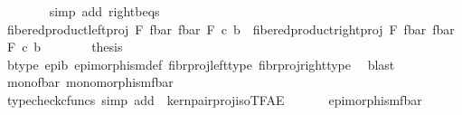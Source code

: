 \begin{isabellebody}
\ \ \ \ \ \ \isamarkupfalse%
\ {\isacharparenleft}{\kern0pt}simp\ add{\isacharcolon}{\kern0pt}\ right{\isacharunderscore}{\kern0pt}b{\isacharunderscore}{\kern0pt}eqs{\isacharparenright}{\kern0pt}\isanewline
\ \ \ \ \isamarkupfalse%
\ \isamarkupfalse%
\ {\isachardoublequoteopen}fibered{\isacharunderscore}{\kern0pt}product{\isacharunderscore}{\kern0pt}left{\isacharunderscore}{\kern0pt}proj\ F\ {\isacharparenleft}{\kern0pt}f{\isacharunderscore}{\kern0pt}bar{\isacharparenright}{\kern0pt}\ {\isacharparenleft}{\kern0pt}f{\isacharunderscore}{\kern0pt}bar{\isacharparenright}{\kern0pt}\ F\ {\isasymcirc}\isactrlsub c\ b\ {\isacharequal}{\kern0pt}\ fibered{\isacharunderscore}{\kern0pt}product{\isacharunderscore}{\kern0pt}right{\isacharunderscore}{\kern0pt}proj\ F\ {\isacharparenleft}{\kern0pt}f{\isacharunderscore}{\kern0pt}bar{\isacharparenright}{\kern0pt}\ {\isacharparenleft}{\kern0pt}f{\isacharunderscore}{\kern0pt}bar{\isacharparenright}{\kern0pt}\ F\ {\isasymcirc}\isactrlsub c\ b{\isachardoublequoteclose}\isacommand{{\isachardot}{\kern0pt}}\isamarkupfalse%
\isanewline
\ \ \ \ \isamarkupfalse%
\ \isamarkupfalse%
\ {\isacharquery}{\kern0pt}thesis\isanewline
\ \ \ \ \ \ \isamarkupfalse%
\ b{\isacharunderscore}{\kern0pt}type\ epi{\isacharunderscore}{\kern0pt}b\ epimorphism{\isacharunderscore}{\kern0pt}def{}\ fibr{\isacharunderscore}{\kern0pt}proj{\isacharunderscore}{\kern0pt}left{\isacharunderscore}{\kern0pt}type\ fibr{\isacharunderscore}{\kern0pt}proj{\isacharunderscore}{\kern0pt}right{\isacharunderscore}{\kern0pt}type\ \isamarkupfalse%
\ blast\isanewline
\ \ \isamarkupfalse%
\isanewline
\ \ \isanewline
\ \ \isamarkupfalse%
\ \isamarkupfalse%
\ mono{\isacharunderscore}{\kern0pt}fbar{\isacharcolon}{\kern0pt}\ {\isachardoublequoteopen}monomorphism{\isacharparenleft}{\kern0pt}f{\isacharunderscore}{\kern0pt}bar{\isacharparenright}{\kern0pt}{\isachardoublequoteclose}\isanewline
\ \ \ \ \isamarkupfalse%
\ {\isacharparenleft}{\kern0pt}typecheck{\isacharunderscore}{\kern0pt}cfuncs{\isacharcomma}{\kern0pt}\ simp\ add{\isacharcolon}{\kern0pt}\ \ kern{\isacharunderscore}{\kern0pt}pair{\isacharunderscore}{\kern0pt}proj{\isacharunderscore}{\kern0pt}iso{\isacharunderscore}{\kern0pt}TFAE{}{\isacharparenright}{\kern0pt}\isanewline
\ \ \isanewline
\ \ \isamarkupfalse%
\ {\isachardoublequoteopen}epimorphism{\isacharparenleft}{\kern0pt}f{\isacharunderscore}{\kern0pt}bar{\isacharparenright}{\kern0pt}{\isachardoublequoteclose}\isanewline

\end{isabellebody}
